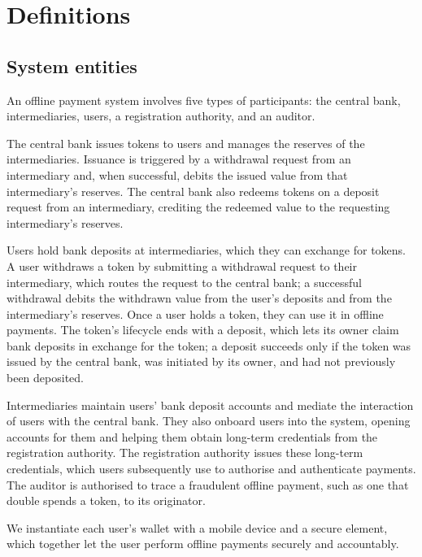 \section{Definitions}\label{sec:offline-definitions}

\subsection{System entities}

An offline payment system involves five types of participants: the central
bank, intermediaries, users, a registration authority, and an auditor.

The central bank issues tokens to users and manages the reserves of the
intermediaries. Issuance is triggered by a withdrawal request from an
intermediary and, when successful, debits the issued value from that
intermediary's reserves. The central bank also redeems tokens on a deposit
request from an intermediary, crediting the redeemed value to the requesting
intermediary's reserves.

Users hold bank deposits at intermediaries, which they can exchange for tokens.
A user withdraws a token by submitting a withdrawal request to their
intermediary, which routes the request to the central bank; a successful
withdrawal debits the withdrawn value from the user's deposits and from the
intermediary's reserves. Once a user holds a token, they can use it in offline
payments. The token's lifecycle ends with a deposit, which lets its owner claim
bank deposits in exchange for the token; a deposit succeeds only if the token
was issued by the central bank, was initiated by its owner, and had not
previously been deposited.

Intermediaries maintain users' bank deposit accounts and mediate the
interaction of users with the central bank. They also onboard users into the
system, opening accounts for them and helping them obtain long-term credentials
from the registration authority. The registration authority issues these
long-term credentials, which users subsequently use to authorise and
authenticate payments. The auditor is authorised to trace a fraudulent offline
payment, such as one that double spends a token, to its originator.

We instantiate each user's wallet with a mobile device and a secure element,
which together let the user perform offline payments securely and accountably.


